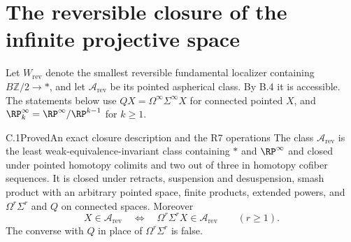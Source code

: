 \section{The reversible closure of the infinite projective space}

Let $W_{\mathrm{rev}}$ denote the smallest reversible fundamental localizer containing $B\mathbb Z/2\to *$, and let $\mathcal A_{\mathrm{rev}}$ be its pointed aspherical class. By B.4 it is accessible. The statements below use $QX=\Omega^\infty\Sigma^\infty X$ for connected pointed $X$, and $\RP^\infty_k=\RP^\infty/\RP^{k-1}$ for $k\geq1$.

\begin{claim}{C.1}{Proved}{An exact closure description and the R7 operations}
The class $\mathcal A_{\mathrm{rev}}$ is the least weak-equivalence-invariant class containing $*$ and $\RP^\infty$ and closed under pointed homotopy colimits and two out of three in homotopy cofiber sequences. It is closed under retracts, suspension and desuspension, smash product with an arbitrary pointed space, finite products, extended powers, and $\Omega^r\Sigma^r$ and $Q$ on connected spaces. Moreover
\[
 X\in\mathcal A_{\mathrm{rev}}
 \quad\Longleftrightarrow\quad
 \Omega^r\Sigma^rX\in\mathcal A_{\mathrm{rev}}
 \qquad(r\geq1).
\]
The converse with $Q$ in place of $\Omega^r\Sigma^r$ is false.
\end{claim}
